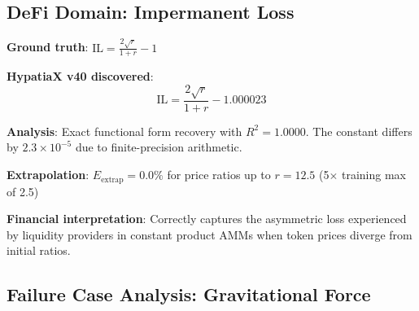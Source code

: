 \documentclass[twoside,11pt]{article}
\begin{document}
\subsection{DeFi Domain: Impermanent Loss}

\begin{example}
\textbf{Ground truth}: $\text{IL} = \frac{2\sqrt{r}}{1+r} - 1$

\textbf{HypatiaX v40 discovered}:
\begin{equation}
\text{IL} = \frac{2\sqrt{r}}{1+r} - 1.000023
\end{equation}

\textbf{Analysis}: Exact functional form recovery with $R^2 = 1.0000$. The constant differs by $2.3 \times 10^{-5}$ due to finite-precision arithmetic.

\textbf{Extrapolation}: $E_{\text{extrap}} = 0.0\%$ for price ratios up to $r = 12.5$ (5$\times$ training max of 2.5)

\textbf{Financial interpretation}: Correctly captures the asymmetric loss experienced by liquidity providers in constant product AMMs when token prices diverge from initial ratios.
\end{example}

\subsection{Failure Case Analysis: Gravitational Force}
\end{document}
